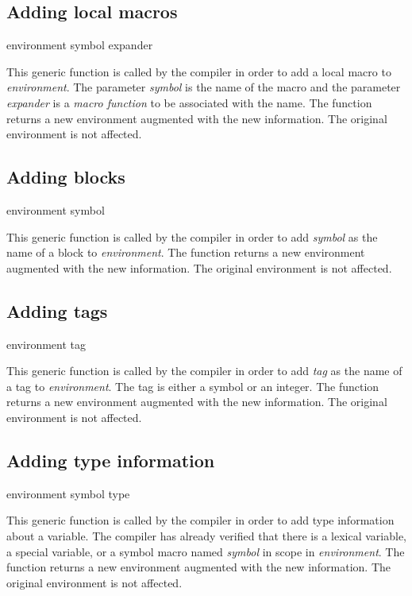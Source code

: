 \subsection{Adding local macros}

 {environment symbol expander}

This generic function is called by the compiler in order to add a
local macro to \textit{environment}.  The parameter \textit{symbol} is
the name of the macro and the parameter \textit{expander} is a
\emph{macro function} to be associated with the name.  The function
returns a new environment augmented with the new information.  The
original environment is not affected.

\subsection{Adding blocks}

 {environment symbol}

This generic function is called by the compiler in order to add
\textit{symbol} as the name of a block to \textit{environment}.  The
function returns a new environment augmented with the new information.
The original environment is not affected.

\subsection{Adding tags}

 {environment tag}

This generic function is called by the compiler in order to add
\textit{tag} as the name of a tag to \textit{environment}.  The tag is
either a symbol or an integer.  The function returns a new environment
augmented with the new information.  The original environment is not
affected.

\subsection{Adding type information}

 {environment symbol type}

This generic function is called by the compiler in order to add type
information about a variable.  The compiler has already verified that
there is a lexical variable, a special variable, or a symbol macro
named \textit{symbol} in scope in \textit{environment}.  The function
returns a new environment augmented with the new information.  The
original environment is not affected.


